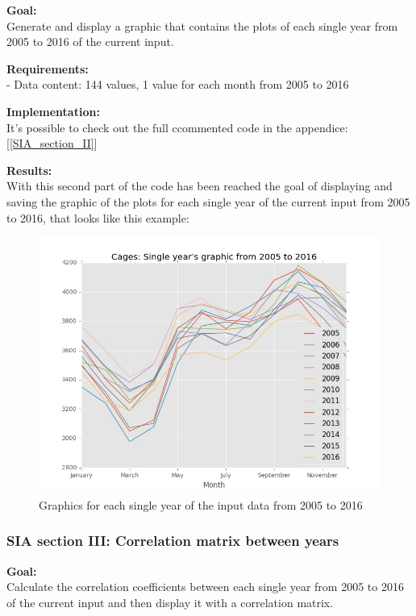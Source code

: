\textbf{Goal:}\\
Generate and display a graphic that contains the plots of each single year from 2005 to 2016 of the current input. 

\textbf{Requirements:}\\
- Data content: 144 values, 1 value for each month from 2005 to 2016

\textbf{Implementation:}\\
It's possible to check out the full ccommented code in the appendice: [\ref{SIA_section_II}]

\textbf{Results:} \\
With this second part of the code has been reached the goal of displaying and saving the graphic of the plots for each single year of the current input from 2005 to 2016, that looks like this example:

\begin{figure}[H]
	\centering
    \includegraphics[width=1\textwidth]{Files/Cages_Years.jpg}
    \caption{Graphics for each single year of the input data from 2005 to 2016}
\end{figure}




\newpage
\subsubsection{SIA section III: Correlation matrix between years}

\textbf{Goal:}\\
Calculate the correlation coefficients between each single year from 2005 to 2016 of the current input and then display it with a correlation matrix.

